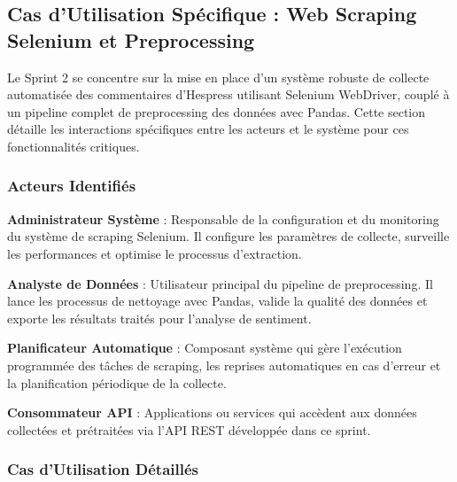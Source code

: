 
\subsection{Cas d'Utilisation Spécifique : Web Scraping Selenium et Preprocessing}

Le Sprint 2 se concentre sur la mise en place d'un système robuste de collecte automatisée des commentaires d'Hespress utilisant Selenium WebDriver, couplé à un pipeline complet de preprocessing des données avec Pandas. Cette section détaille les interactions spécifiques entre les acteurs et le système pour ces fonctionnalités critiques.

\subsubsection{Acteurs Identifiés}

\textbf{Administrateur Système} : Responsable de la configuration et du monitoring du système de scraping Selenium. Il configure les paramètres de collecte, surveille les performances et optimise le processus d'extraction.

\textbf{Analyste de Données} : Utilisateur principal du pipeline de preprocessing. Il lance les processus de nettoyage avec Pandas, valide la qualité des données et exporte les résultats traités pour l'analyse de sentiment.

\textbf{Planificateur Automatique} : Composant système qui gère l'exécution programmée des tâches de scraping, les reprises automatiques en cas d'erreur et la planification périodique de la collecte.

\textbf{Consommateur API} : Applications ou services qui accèdent aux données collectées et prétraitées via l'API REST développée dans ce sprint.

\subsubsection{Cas d'Utilisation Détaillés}

